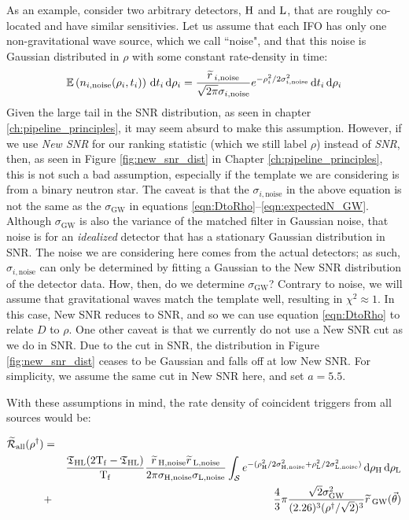 As an example, consider two arbitrary detectors, $\mathrm{H}$ and $\mathrm{L}$, that are roughly co-located and have similar sensitivies. Let us assume that each \ac{IFO} has only one non-gravitational wave source, which we call ``noise", and that this noise is Gaussian distributed in $\rho$ with some constant rate-density in time:
\begin{equation}
\mathbb{E}\left(n_{i,\mathrm{noise}}(\rho_i,t_i)\right)\,\mathrm{d} t_i \,\mathrm{d}\rho_i = \frac{\widetilde{r}\,_{i,\mathrm{noise}}}{\sqrt{2\pi} \sigma_{i,\mathrm{noise}}} e^{-\rho_i^2 / 2\sigma_{i,\mathrm{noise}}^2} \,\mathrm{d} t_i \,\mathrm{d}\rho_i
\end{equation}
Given the large tail in the \ac{SNR} distribution, as seen in chapter \ref{ch:pipeline_principles}, it may seem absurd to make this assumption. However, if we use \emph{New \ac{SNR}} for our ranking statistic (which we still label $\rho$) instead of \emph{\ac{SNR}}, then, as seen in Figure \ref{fig:new_snr_dist} in Chapter \ref{ch:pipeline_principles}, this is not such a bad assumption, especially if the template we are considering is from a binary neutron star. The caveat is that the $\sigma_{i,\mathrm{noise}}$ in the above equation is not the same as the $\sigma_{\mathrm{GW}}$ in equations \ref{eqn:DtoRho}--\ref{eqn:expectedN_GW}. Although $\sigma_{\mathrm{GW}}$ is also the variance of the matched filter in Gaussian noise, that noise is for an \emph{idealized} detector that has a stationary Gaussian distribution in \ac{SNR}. The noise we are considering here comes from the actual detectors; as such, $\sigma_{i,\mathrm{noise}}$ can only be determined by fitting a Gaussian to the New \ac{SNR} distribution of the detector data. How, then, do we determine $\sigma_{\mathrm{GW}}$? Contrary to noise, we will assume that gravitational waves match the template well, resulting in $\chi^2 \approx 1$. In this case, New \ac{SNR} reduces to \ac{SNR}, and so we can use equation \ref{eqn:DtoRho} to relate $D$ to $\rho$. One other caveat is that we currently do not use a New \ac{SNR} cut as we do in \ac{SNR}. Due to the cut in \ac{SNR}, the distribution in Figure \ref{fig:new_snr_dist} ceases to be Gaussian and falls off at low New \ac{SNR}. For simplicity, we assume the same cut in New SNR here, and set $a = 5.5$.

With these assumptions in mind, the rate density of coincident triggers from all sources would be:

\begin{eqnarray}
\label{eqn:exampleSources}
\widetilde{\mathcal{R}}_{\mathrm{all}}(\rho^\dagger) & = & \nonumber \\
&   & \frac{\mathfrak{T}_{\mathrm{H}\mathrm{L}}(2\mathrm{T_f} - \mathfrak{T}_{\mathrm{H}\mathrm{L}})}{\mathrm{T_f}} \frac{\widetilde{r}\,_{\mathrm{H},\mathrm{noise}}\widetilde{r}\,_{\mathrm{L},\mathrm{noise}}}{2\pi \sigma_{\mathrm{H},\mathrm{noise}} \sigma_{\mathrm{L},\mathrm{noise}}} \int_{\mathcal{S}} e^{-(\rho_{\mathrm{H}}^2 / 2\sigma_{\mathrm{H},\mathrm{noise}}^2 + \rho_{\mathrm{L}}^2 / 2\sigma_{\mathrm{L},\mathrm{noise}}^2 )} \,\mathrm{d} \rho_{\mathrm{H}} \,\mathrm{d} \rho_{\mathrm{L}} \nonumber \\
 & + & \frac{4}{3} \pi \frac{\sqrt{2} \sigma_{\mathrm{GW}}^2}{(2.26)^3 (\rho^\dagger / \sqrt{2})^3} \widetilde{r}\,_{\mathrm{GW}}(\vec{\theta})
\end{eqnarray}

